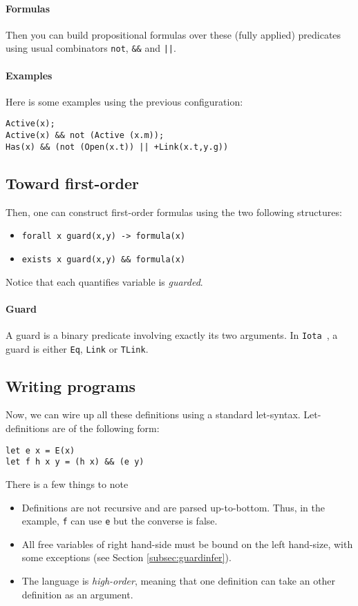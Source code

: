 \documentclass[10pt,a4paper]{article}
\newcommand{\ocaml}{\texttt}
\newcommand{\Iota}{\texttt{Iota }}
\begin{document}
\paragraph{Formulas}
Then you can build propositional formulas over these (fully applied) predicates using usual combinators \ocaml{not}, \ocaml{&&} and \ocaml{||}.

\paragraph{Examples}
Here is some examples using the previous configuration:
\begin{verbatim}
Active(x);
Active(x) && not (Active (x.m));
Has(x) && (not (Open(x.t)) || +Link(x.t,y.g))
\end{verbatim}

\subsection{Toward first-order}
Then, one can construct first-order formulas using the two following structures:
\begin{itemize}
\item \ocaml{forall x guard(x,y) -> formula(x)}
\item \ocaml{exists x guard(x,y) && formula(x)}
\end{itemize}
Notice that each quantifies variable is \emph{guarded}.

\paragraph{Guard}
A guard is a binary predicate involving exactly its two arguments. In \Iota, a guard is either \ocaml{Eq}, \ocaml{Link} or \ocaml{TLink}.

\subsection{Writing programs}
Now, we can wire up all these definitions using a standard let-syntax. Let-definitions are of the following form:
\begin{verbatim}
let e x = E(x)
let f h x y = (h x) && (e y)
\end{verbatim}
There is a few things to note
\begin{itemize}
\item Definitions are not recursive and are parsed up-to-bottom. Thus, in the example, \ocaml{f} can use \ocaml{e} but the converse is false.
\item All free variables of right hand-side must be bound on the left hand-size, with some exceptions (see Section \ref{subsec:guardinfer}).
\item The language is \emph{high-order}, meaning that one definition can take an other definition as an argument.
\end{itemize}
\end{document}
